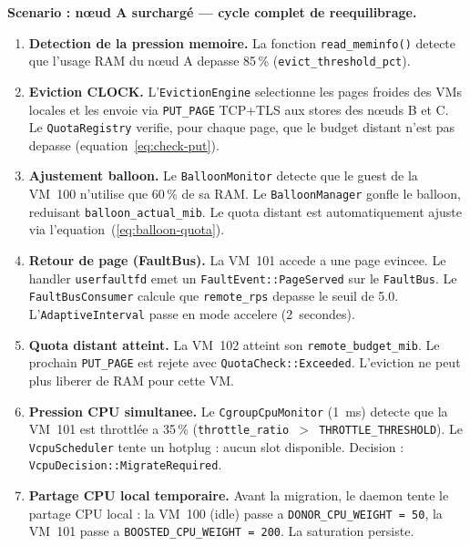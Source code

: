 \textbf{Scenario : nœud A surchargé --- cycle complet de reequilibrage.}

\begin{enumerate}
    \item \textbf{Detection de la pression memoire.} La fonction \texttt{read\_meminfo()} detecte que l'usage RAM du nœud A depasse 85\,\% (\texttt{evict\_threshold\_pct}).

    \item \textbf{Eviction CLOCK.} L'\texttt{EvictionEngine} selectionne les pages froides des VMs locales et les envoie via \texttt{PUT\_PAGE} TCP+TLS aux stores des nœuds B et C. Le \texttt{QuotaRegistry} verifie, pour chaque page, que le budget distant n'est pas depasse (equation~\ref{eq:check-put}).

    \item \textbf{Ajustement balloon.} Le \texttt{BalloonMonitor} detecte que le guest de la VM~100 n'utilise que 60\,\% de sa RAM. Le \texttt{BalloonManager} gonfle le balloon, reduisant \texttt{balloon\_actual\_mib}. Le quota distant est automatiquement ajuste via l'equation~(\ref{eq:balloon-quota}).

    \item \textbf{Retour de page (FaultBus).} La VM~101 accede a une page evincee. Le handler \texttt{userfaultfd} emet un \texttt{FaultEvent::PageServed} sur le \texttt{FaultBus}. Le \texttt{FaultBusConsumer} calcule que \texttt{remote\_rps} depasse le seuil de 5.0. L'\texttt{AdaptiveInterval} passe en mode accelere (2~secondes).

    \item \textbf{Quota distant atteint.} La VM~102 atteint son \texttt{remote\_budget\_mib}. Le prochain \texttt{PUT\_PAGE} est rejete avec \texttt{QuotaCheck::Exceeded}. L'eviction ne peut plus liberer de RAM pour cette VM.

    \item \textbf{Pression CPU simultanee.} Le \texttt{CgroupCpuMonitor} (1~ms) detecte que la VM~101 est throttlée a 35\,\% (\texttt{throttle\_ratio $>$ THROTTLE\_THRESHOLD}). Le \texttt{VcpuScheduler} tente un hotplug : aucun slot disponible. Decision : \texttt{VcpuDecision::MigrateRequired}.

    \item \textbf{Partage CPU local temporaire.} Avant la migration, le daemon tente le partage CPU local : la VM~100 (idle) passe a \texttt{DONOR\_CPU\_WEIGHT = 50}, la VM~101 passe a \texttt{BOOSTED\_CPU\_WEIGHT = 200}. La saturation persiste.


\end{enumerate}
